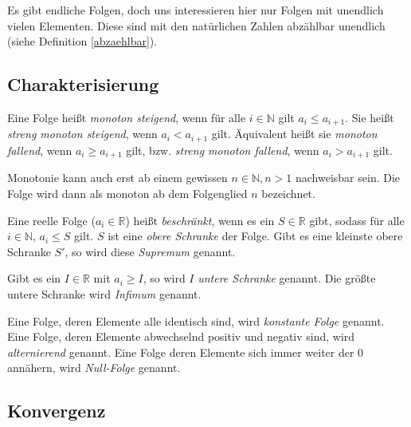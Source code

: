 Es gibt endliche Folgen, doch uns interessieren hier nur Folgen mit unendlich vielen Elementen. Diese sind mit den natürlichen Zahlen abzählbar unendlich (siehe Definition \ref{abzaehlbar}).

\subsection{Charakterisierung}

\begin{definition}
Eine Folge heißt \textsl{monoton steigend}, wenn für alle $i\in \mathbb{N}$ gilt $a_i\le a_{i+1}$. Sie heißt \textsl{streng monoton steigend}, wenn $a_i < a_{i+1}$ gilt. Äquivalent heißt sie \textsl{monoton fallend}, wenn $a_i\ge a_{i+1}$ gilt, bzw. \textsl{streng monoton fallend}, wenn $a_i > a_{i+1}$ gilt.
\end{definition}

Monotonie kann auch erst ab einem gewissen $n\in \mathbb{N}, n>1$ nachweisbar sein. Die Folge wird dann als monoton ab dem Folgenglied $n$ bezeichnet.

\begin{definition}
Eine reelle Folge ($a_i \in \mathbb{R}$) heißt \textsl{beschränkt}, wenn es ein $S\in \mathbb{R}$ gibt, sodass für alle $i\in \mathbb{N}$, $a_i \le S$ gilt. $S$ ist eine \textsl{obere Schranke} der Folge. Gibt es eine kleinste obere Schranke $S'$, so wird diese \textsl{Supremum} genannt. 

Gibt es ein $I\in \mathbb{R}$ mit $a_i \ge I$, so wird $I$ \textsl{untere Schranke} genannt. Die größte untere Schranke wird \textsl{Infimum} genannt.
\end{definition}

\begin{definition}
Eine Folge, deren Elemente alle identisch sind, wird \textsl{konstante Folge} genannt. Eine Folge, deren Elemente abwechselnd positiv und negativ sind, wird \textsl{alternierend} genannt. Eine Folge deren Elemente sich immer weiter der 0 annähern, wird \textsl{Null-Folge} genannt.
\end{definition}

\subsection{Konvergenz}

